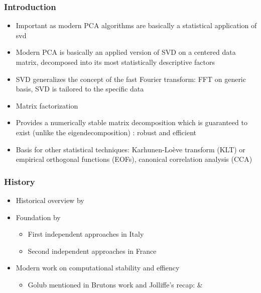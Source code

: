 \subsubsection{Introduction}

\begin{itemize}
	\item Important as modern PCA algorithms are basically a statistical application of \gls{svd}
	\item Modern PCA is basically an applied version of SVD on a centered data matrix, decomposed into its most statistically descriptive factors
	\item SVD generalizes the concept of the fast Fourier transform: FFT on generic basis, SVD is tailored to the specific data
	\item Matrix factorization
	\item Provides a numerically stable matrix decomposition which is guaranteed to exist (unlike the eigendecomposition) \cite{brunton2019data}: robust and efficient
	\item Basis for other statistical techniques: Karhunen-Loève transform (KLT) or empirical orthogonal functions (EOFs), canonical correlation analysis (CCA)
\end{itemize}

\clearpage



\subsubsection{History}

\begin{itemize}
	\item Historical overview by \cite{stewart1993early}
	\item Foundation by
	\begin{itemize}
		\item First independent approaches in Italy \cite{beltrami1873sulle}
		\item Second independent approaches in France \cite{Jordan1874}	
	\end{itemize}
	\item Modern work on computational stability and effiency \cite{brunton2019data}
	\begin{itemize}
		\item Golub mentioned in Brutons work and Jolliffe's recap: \cite{golub1965calculating} \& \cite{golub1971singular}
	\end{itemize}
\end{itemize}

